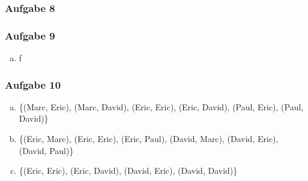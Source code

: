 \documentclass[12pt, a4paper, oneside]{article}
\begin{document}
\subsubsection{Aufgabe 8}

\subsubsection{Aufgabe 9}
\begin{enumerate}[(a)]
  \item f
\end{enumerate}


\subsubsection{Aufgabe 10}
\begin{enumerate}[(a)]
  \item \{(Marc, Eric), (Marc, David), (Eric, Eric), (Eric, David), (Paul, Eric), (Paul, David)\}
  \item \{(Eric, Marc), (Eric, Eric), (Eric, Paul), (David, Marc), (David, Eric), (David, Paul)\}
  \item \{(Eric, Eric), (Eric, David), (David, Eric), (David, David)\}
\end{enumerate}

 
\end{document}
